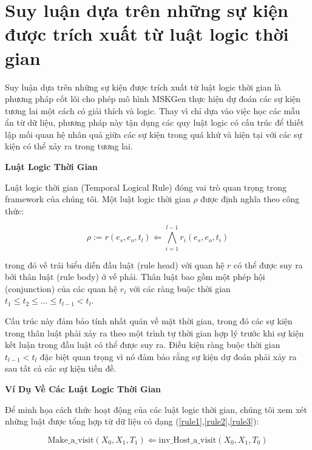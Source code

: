 \section{Suy luận dựa trên những sự kiện được trích xuất từ luật logic thời gian}

Suy luận dựa trên những sự kiện được trích xuất từ luật logic thời gian là phương pháp cốt lõi cho phép mô hình MSKGen thực hiện dự đoán các sự kiện tương lai một cách có giải thích và logic. Thay vì chỉ dựa vào việc học các mẫu ẩn từ dữ liệu, phương pháp này tận dụng các quy luật logic có cấu trúc để thiết lập mối quan hệ nhân quả giữa các sự kiện trong quá khứ và hiện tại với các sự kiện có thể xảy ra trong tương lai.

\textbf{Luật Logic Thời Gian}

Luật logic thời gian (Temporal Logical Rule) đóng vai trò quan trọng trong framework của chúng tôi. Một luật logic thời gian $\rho$ được định nghĩa theo công thức:

\[
\rho := r(e_s, e_o, t_l) \Leftarrow \bigwedge_{i=1}^{l-1} r_i(e_s, e_o, t_i)
\]

trong đó vế trái biểu diễn đầu luật (rule head) với quan hệ $r$ có thể được suy ra bởi thân luật (rule body) ở vế phải. Thân luật bao gồm một phép hội (conjunction) của các quan hệ $r_i$ với các ràng buộc thời gian $t_1 \leq t_2 \leq ... \leq t_{l-1} < t_l$.


Cấu trúc này đảm bảo tính nhất quán về mặt thời gian, trong đó các sự kiện trong thân luật phải xảy ra theo một trình tự thời gian hợp lý trước khi sự kiện kết luận trong đầu luật có thể được suy ra. Điều kiện ràng buộc thời gian $t_{l-1} < t_l$ đặc biệt quan trọng vì nó đảm bảo rằng sự kiện dự đoán phải xảy ra sau tất cả các sự kiện tiền đề.

\textbf{Ví Dụ Về Các Luật Logic Thời Gian}

Để minh họa cách thức hoạt động của các luật logic thời gian, chúng tôi xem xét những luật được tổng hợp từ dữ liệu có dạng (\ref{rule1},\ref{rule2},\ref{rule3}):

\begin{equation}
\text{Make\_a\_visit}(X_0, X_1, T_1) \Leftarrow \text{inv\_Host\_a\_visit}(X_0, X_1, T_0)
\label{rule1}
\end{equation}

